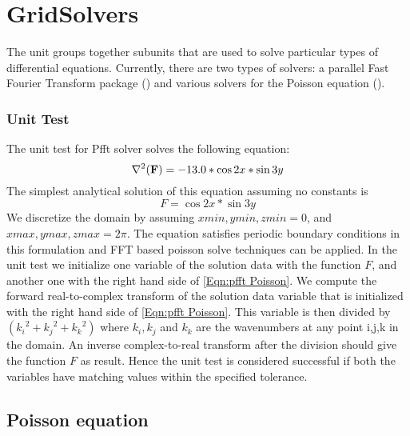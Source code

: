 \section{GridSolvers}
\label{Sec:Solvers}


The  unit groups together subunits that are used
to solve particular types of differential equations.  Currently, there
are two types of solvers:  a parallel Fast Fourier Transform package ()
and various solvers for the Poisson equation ().



\subsubsection{Unit Test}
\label{Sec:GridSolversPfftUnitTests}

The unit test for Pfft solver solves the following equation:
\begin{equation}
\label{Eqn:pfft Poisson}
\nabla^2({\bf F})=-13.0*\cos2x*\sin3y
\end{equation}
The simplest analytical solution of this equation assuming no
constants is
\begin{equation}
F=\cos2x*\sin3y
\end{equation}
We discretize the domain by assuming $xmin,ymin,zmin=0$, and
$xmax,ymax,zmax=2\pi$. The equation satisfies periodic boundary
conditions in this formulation and FFT based poisson solve techniques
can be applied. In the unit test we initialize one variable of the
solution data with the function $F$, and another one
with the right hand side of  \eqref{Eqn:pfft Poisson}. We
compute the forward real-to-complex transform of the solution data
variable that is initialized with the right hand side of \eqref{Eqn:pfft
Poisson}.  This variable is then divided by  
$({k_i}^2+{k_j}^2+{k_k}^2)$ where ${k_i, k_j}$ and ${k_k}$ are the
wavenumbers at any point {i,j,k} in the domain. An inverse complex-to-real
transform after the division should give the function $F$ as
result. Hence the unit test is considered successful if both the
variables have matching values within the specified tolerance.

\subsection{Poisson equation}
\label{Sec:GridSolversPoisson}

